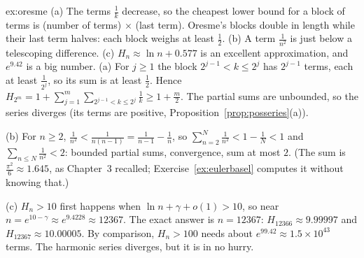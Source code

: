 \begin{solution}{ex:oresme}
\idea (a) The terms $\frac1k$ decrease, so the cheapest lower bound for a block of terms is (number of terms) $\times$ (last term). Oresme's blocks double in length while their last term halves: each block weighs at least $\frac12$. (b) A term $\frac1{n^2}$ is just below a telescoping difference. (c) $H_n\approx\ln n+0.577$ is an excellent approximation, and $e^{9.42}$ is a big number.
\writeup (a) For $j\ge1$ the block $2^{j-1}<k\le2^j$ has $2^{j-1}$ terms, each at least $\frac1{2^j}$, so its sum is at least $\frac12$. Hence
$H_{2^m}=1+\sum_{j=1}^m\sum_{2^{j-1}<k\le2^j}\frac1k\ge1+\frac m2$. The partial sums are unbounded, so the series diverges (its terms are positive, Proposition~\ref{prop:posseries}(a)).

(b) For $n\ge2$, $\frac1{n^2}<\frac1{n(n-1)}=\frac1{n-1}-\frac1n$, so $\sum_{n=2}^N\frac1{n^2}<1-\frac1N<1$ and $\sum_{n\le N}\frac1{n^2}<2$: bounded partial sums, convergence, sum at most $2$. (The sum is $\frac{\pi^2}6\approx1.645$, as Chapter~3 recalled; Exercise~\ref{ex:eulerbasel} computes it without knowing that.)

(c) $H_n>10$ first happens when $\ln n+\gamma+o(1)>10$, so near $n=e^{10-\gamma}\approx e^{9.4228}\approx12367$. The exact answer is $n=12367$: $H_{12366}\approx9.99997$ and $H_{12367}\approx10.00005$. By comparison, $H_n>100$ needs about $e^{99.42}\approx1.5\times10^{43}$ terms. The harmonic series diverges, but it is in no hurry.
\end{solution}

